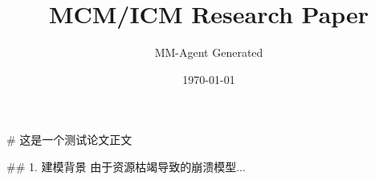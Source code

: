 \documentclass{article}
\title{MCM/ICM Research Paper}
\author{MM-Agent Generated}
\date{\today}
\begin{document}
\maketitle
# 这是一个测试论文正文

## 1. 建模背景
由于资源枯竭导致的崩溃模型...\n
\end{document}
